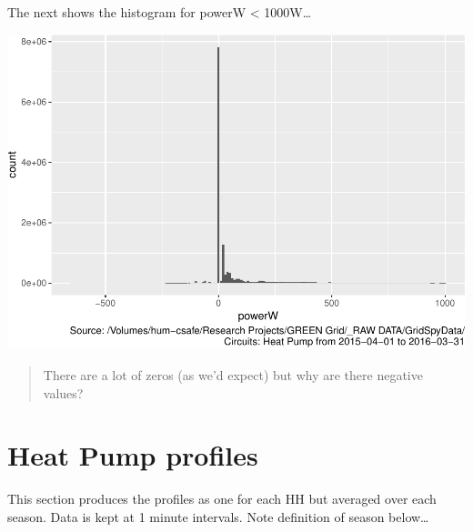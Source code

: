 \documentclass[]{article}
\begin{document}
The next shows the histogram for powerW \textless{} 1000W\ldots{}

\includegraphics{nzGGHouseholdPowerDemandProfile_Heat Pump_2015-04-01_2016-03-31_files/figure-latex/histo power under 1000-1.pdf}

\begin{quote}
There are a lot of zeros (as we'd expect) but why are there negative
values?
\end{quote}

\section{Heat Pump profiles}\label{heat-pump-profiles}

This section produces the profiles as one for each HH but averaged over
each season. Data is kept at 1 minute intervals. Note definition of
season below\ldots{}
\end{document}
